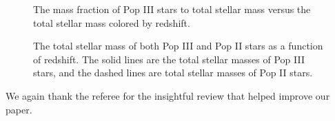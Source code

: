 \documentclass[11pt]{article}
\begin{document}
\begin{figure}[h]
    \centering
    \qquad
    \caption{The mass fraction of Pop III stars to total stellar mass versus the total stellar mass colored by redshift.}%
    \label{fig:ratio}%
\end{figure}

\begin{figure}[h]
    \centering
    \qquad
    \caption{The total stellar mass of both Pop III and Pop II stars as a function of redshift. The solid lines are the total stellar masses of Pop III stars, and the dashed lines are total stellar masses of Pop II stars.}%
    \label{fig:ratio}%
\end{figure}

We again thank the referee for the insightful review that helped
improve our paper.



\end{document}
